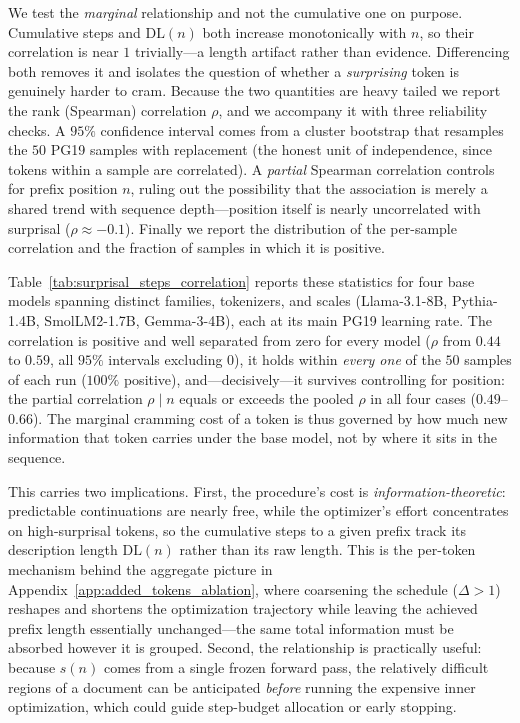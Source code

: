 We test the \emph{marginal} relationship and not the cumulative one on purpose. Cumulative steps and
$\mathrm{DL}(n)$ both increase monotonically with $n$, so their correlation is near $1$ trivially---a
length artifact rather than evidence. Differencing both removes it and isolates the question of
whether a \emph{surprising} token is genuinely harder to cram. Because the two quantities are heavy
tailed we report the rank (Spearman) correlation $\rho$, and we accompany it with three reliability
checks. A $95\%$ confidence interval comes from a cluster bootstrap that resamples the $50$ PG19
samples with replacement (the honest unit of independence, since tokens within a sample are
correlated). A \emph{partial} Spearman correlation controls for prefix position $n$, ruling out the
possibility that the association is merely a shared trend with sequence depth---position itself is
nearly uncorrelated with surprisal ($\rho \approx -0.1$). Finally we report the distribution of the
per-sample correlation and the fraction of samples in which it is positive.

Table~\ref{tab:surprisal_steps_correlation} reports these statistics for four base models spanning
distinct families, tokenizers, and scales (Llama-3.1-8B, Pythia-1.4B, SmolLM2-1.7B, Gemma-3-4B), each
at its main PG19 learning rate. The correlation is positive and well separated from zero for every
model ($\rho$ from $0.44$ to $0.59$, all $95\%$ intervals excluding $0$), it holds within
\emph{every one} of the $50$ samples of each run ($100\%$ positive), and---decisively---it survives
controlling for position: the partial correlation $\rho \mid n$ equals or exceeds the pooled $\rho$
in all four cases ($0.49$--$0.66$). The marginal cramming cost of a token is thus governed by how
much new information that token carries under the base model, not by where it sits in the sequence.

This carries two implications. First, the procedure's cost is \emph{information-theoretic}:
predictable continuations are nearly free, while the optimizer's effort concentrates on high-surprisal
tokens, so the cumulative steps to a given prefix track its description length $\mathrm{DL}(n)$ rather
than its raw length. This is the per-token mechanism behind the aggregate picture in
Appendix~\ref{app:added_tokens_ablation}, where coarsening the schedule ($\Delta > 1$) reshapes and
shortens the optimization trajectory while leaving the achieved prefix length essentially
unchanged---the same total information must be absorbed however it is grouped. Second, the relationship
is practically useful: because $s(n)$ comes from a single frozen forward pass, the relatively
difficult regions of a document can be anticipated \emph{before} running the expensive inner
optimization, which could guide step-budget allocation or early stopping.

